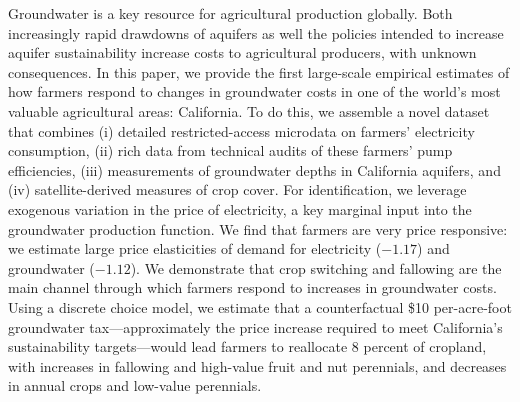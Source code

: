%

\noindent
Groundwater is a key resource for agricultural production globally. Both increasingly rapid drawdowns of aquifers as well the policies intended to increase aquifer sustainability increase costs to agricultural producers, with unknown consequences. In this paper, we provide the first large-scale empirical estimates of how farmers respond to changes in groundwater costs in one of the world's most valuable agricultural areas: California. To do this, we assemble a novel dataset that combines (i) detailed restricted-access microdata on farmers' electricity consumption, (ii) rich data from technical audits of these farmers' pump efficiencies, (iii) measurements of groundwater depths in California aquifers, and (iv) satellite-derived measures of crop cover. For identification, we leverage exogenous variation in the price of electricity, a key marginal input into the groundwater production function. We find that farmers are very price responsive: we estimate large price elasticities of demand for electricity ($-1.17$) and groundwater ($-1.12$). We demonstrate that crop switching and fallowing are the main channel through which farmers respond to increases in groundwater costs. Using a discrete choice model, we estimate that a counterfactual \$10 per-acre-foot groundwater tax---approximately the price increase required to meet California's sustainability targets---would lead farmers to reallocate 8 percent of cropland, with increases in fallowing and high-value fruit and nut perennials, and decreases in annual crops and low-value perennials. 
%
\\

